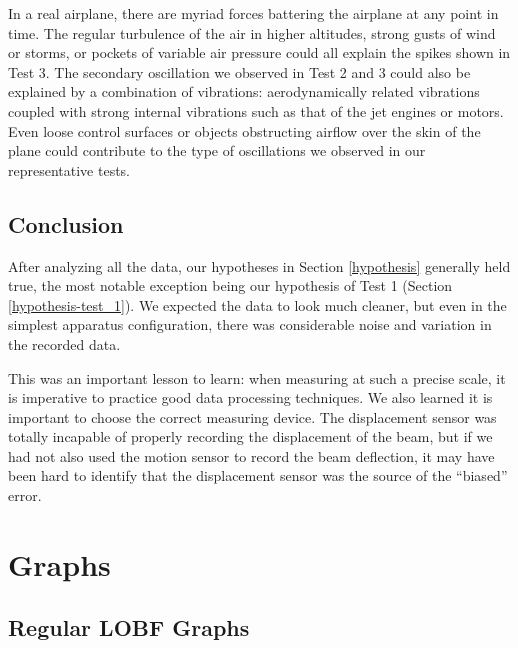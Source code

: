 \documentclass[12 pt]{report}
\begin{document}
In a real airplane, there are myriad forces battering the airplane at any point in time. The regular turbulence of the air in higher altitudes, strong gusts of wind or storms, or pockets of variable air pressure could all explain the spikes shown in Test \num{3}. The secondary oscillation we observed in Test \num{2} and \num{3} could also be explained by a combination of vibrations: aerodynamically related vibrations coupled with strong internal vibrations such as that of the jet engines or motors. Even loose control surfaces or objects obstructing airflow over the skin of the plane could contribute to the type of oscillations we observed in our representative tests.

\section{Conclusion} \label{conclusion-section}
After analyzing all the data, our hypotheses in Section \ref{hypothesis} generally held true, the most notable exception being our hypothesis of Test \num{1} (Section \ref{hypothesis-test_1}). We expected the data to look much cleaner, but even in the simplest apparatus configuration, there was considerable noise and variation in the recorded data.

This was an important lesson to learn: when measuring at such a precise scale, it is imperative to practice good data processing techniques. We also learned it is important to choose the correct measuring device. The displacement sensor was totally incapable of properly recording the displacement of the beam, but if we had not also used the motion sensor to record the beam deflection, it may have been hard to identify that the displacement sensor was the source of the ``biased'' error.

\printbibliography[heading=subbibintoc]

\appendix
\chapter{Graphs} \label{graphs}
\section{Regular LOBF Graphs} \label{regular_lobf_graphs}

\end{document}
